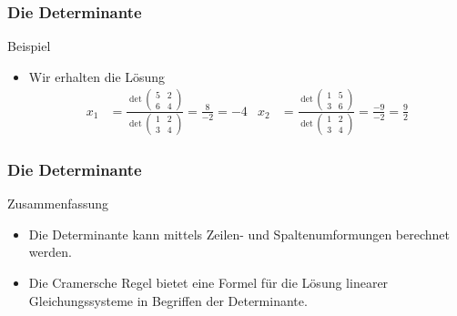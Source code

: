 \documentclass{beamer}
\renewcommand{\oe}{\"o}
\newcommand{\ue}{\"u}
\newcommand{\mytitle}{Die Determinante}
\begin{document}
\begin{frame}\frametitle{\mytitle}
	\begin{block}{Beispiel}
		\begin{itemize}
			\item Wir erhalten die L\oe sung
				\begin{align*}
					x_1&=\frac{\det\begin{pmatrix} 5&2\\6&4 \end{pmatrix}}{\det\begin{pmatrix} 1&2\\3&4 \end{pmatrix}}=\frac{8}{-2}=-4&
					x_2&=\frac{\det\begin{pmatrix} 1&5\\3&6 \end{pmatrix}}{\det\begin{pmatrix} 1&2\\3&4 \end{pmatrix}}=\frac{-9}{-2}=\frac{9}{2}
				\end{align*}
		\end{itemize}
	\end{block}
\end{frame}

\begin{frame}\frametitle{\mytitle}
	\begin{block}{Zusammenfassung}
		\begin{itemize}
			\item Die Determinante kann mittels Zeilen- und Spaltenumformungen berechnet werden.
			\item Die Cramersche Regel bietet eine Formel f\ue r die L\oe sung linearer Gleichungssysteme in Begriffen der Determinante.
		\end{itemize}
	\end{block}
\end{frame}
\end{document}
